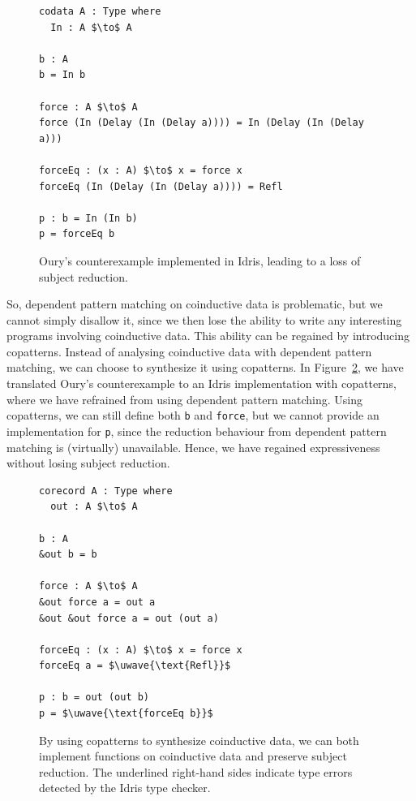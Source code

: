 \begin{figure}
\begin{lstlisting}[mathescape]
codata A : Type where
  In : A $\to$ A

b : A
b = In b

force : A $\to$ A
force (In (Delay (In (Delay a)))) = In (Delay (In (Delay a)))

forceEq : (x : A) $\to$ x = force x
forceEq (In (Delay (In (Delay a)))) = Refl

p : b = In (In b)
p = forceEq b
\end{lstlisting}
  \caption{Oury's counterexample implemented in Idris, leading to a loss of
    subject reduction.}
\label{fig:ourys_counterexample_idris}
\end{figure}

So, dependent pattern matching on coinductive data is problematic, but we cannot
simply disallow it, since we then lose the ability to write any interesting
programs involving coinductive data. This ability can be regained by introducing
copatterns. Instead of analysing coinductive data with dependent pattern
matching, we can choose to synthesize it using copatterns. In
Figure~\ref{fig:ourys_counterexample_copatterns}, we have translated Oury's
counterexample to an Idris implementation with copatterns, where we have
refrained from using dependent pattern matching. Using copatterns, we can still
define both \texttt{b} and \texttt{force}, but we cannot provide an
implementation for \texttt{p}, since the reduction behaviour from dependent
pattern matching is (virtually) unavailable. Hence, we have regained
expressiveness without losing subject reduction.

\begin{figure}[h]
\begin{lstlisting}[mathescape]
corecord A : Type where
  out : A $\to$ A

b : A
&out b = b

force : A $\to$ A
&out force a = out a
&out &out force a = out (out a)

forceEq : (x : A) $\to$ x = force x
forceEq a = $\uwave{\text{Refl}}$

p : b = out (out b)
p = $\uwave{\text{forceEq b}}$
\end{lstlisting}
  \caption{By using copatterns to synthesize coinductive data, we can both
    implement functions on coinductive data and preserve subject
    reduction. The underlined right-hand sides indicate type errors detected by
    the Idris type checker.}
\label{fig:ourys_counterexample_copatterns}
\end{figure}

